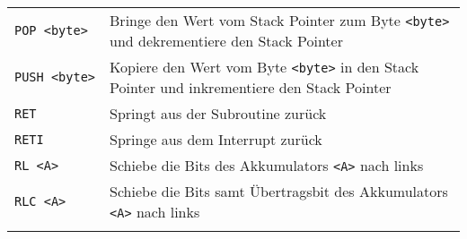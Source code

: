\begin{longtable}[c]{@{}ll@{}}
\begin{minipage}[t]{0.25\columnwidth}
\texttt{POP\ \textless{}byte\textgreater{}}
\strut\end{minipage} &
\begin{minipage}[t]{0.69\columnwidth}\raggedright\strut
Bringe den Wert vom Stack Pointer zum Byte
\texttt{\textless{}byte\textgreater{}} und dekrementiere den Stack
Pointer
\strut\end{minipage}\tabularnewline
\begin{minipage}[t]{0.25\columnwidth}\raggedright\strut
\texttt{PUSH\ \textless{}byte\textgreater{}}
\strut\end{minipage} &
\begin{minipage}[t]{0.69\columnwidth}\raggedright\strut
Kopiere den Wert vom Byte \texttt{\textless{}byte\textgreater{}} in den
Stack Pointer und inkrementiere den Stack Pointer
\strut\end{minipage}\tabularnewline
\begin{minipage}[t]{0.25\columnwidth}\raggedright\strut
\texttt{RET}
\strut\end{minipage} &
\begin{minipage}[t]{0.69\columnwidth}\raggedright\strut
Springt aus der Subroutine zurück
\strut\end{minipage}\tabularnewline
\begin{minipage}[t]{0.25\columnwidth}\raggedright\strut
\texttt{RETI}
\strut\end{minipage} &
\begin{minipage}[t]{0.69\columnwidth}\raggedright\strut
Springe aus dem Interrupt zurück
\strut\end{minipage}\tabularnewline
\begin{minipage}[t]{0.25\columnwidth}\raggedright\strut
\texttt{RL\ \textless{}A\textgreater{}}
\strut\end{minipage} &
\begin{minipage}[t]{0.69\columnwidth}\raggedright\strut
Schiebe die Bits des Akkumulators \texttt{\textless{}A\textgreater{}}
nach links
\strut\end{minipage}\tabularnewline
\begin{minipage}[t]{0.25\columnwidth}\raggedright\strut
\texttt{RLC\ \textless{}A\textgreater{}}
\strut\end{minipage} &
\begin{minipage}[t]{0.69\columnwidth}\raggedright\strut
Schiebe die Bits samt Übertragsbit des Akkumulators
\texttt{\textless{}A\textgreater{}} nach links
\strut\end{minipage}\tabularnewline
\begin{minipage}[t]{0.25\columnwidth}\raggedright\strut

\end{minipage}
\end{longtable}
